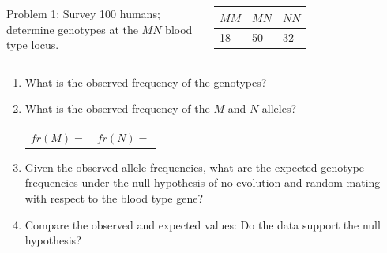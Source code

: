 \begin{frame}
    \small

    \begin{adjustwidth}{-1.5em}{-1.5em}
    \vspace{-0.2cm}
    \begin{columns}
    Problem 1: Survey 100 humans; determine genotypes at the $MN$ blood type
    locus.

    \begin{table}%
        \small
        \centering
        \begin{tabular}{ p{1cm} p{1cm} p{1cm} }
            \toprule
            $MM$ & {$MN$} & {$NN$} \\
            \hline
            18 & 50 & 32 \\
            \bottomrule
        \end{tabular}
    \end{table}
    \end{columns}

    \vspace{2mm}
    \begin{enumerate}
            \small
        \item What is the observed frequency of the genotypes? 

        \item What is the observed frequency of the $M$ and $N$ alleles?
        \begin{tabular}{ p{4cm} p{1cm} }
            $fr(M) = $ & $fr(N) = $ \\
        \end{tabular}
        
        \item Given the observed allele frequencies, what are the expected
            genotype frequencies under the null hypothesis of no evolution and
            random mating with respect to the blood type gene?

        \item Compare the observed and expected values: Do the data support the
            null hypothesis?
    \end{enumerate}
    \end{adjustwidth}
\end{frame}


